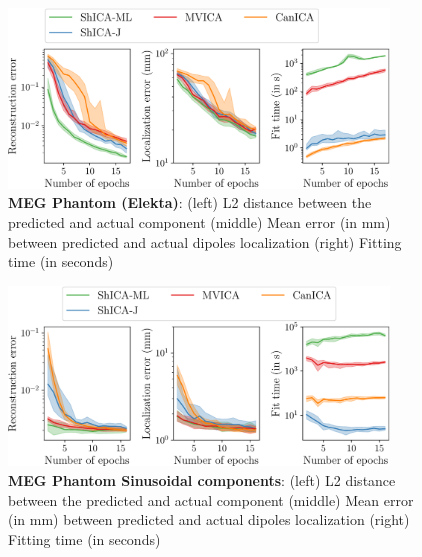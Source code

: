 \begin{figure}
\centering
  \includegraphics[width=0.9\textwidth]{./figures/amvica/meg_phantom.pdf}
  \caption{\textbf{MEG Phantom (Elekta)}: (left) L2 distance between the predicted and actual component (middle) Mean error (in mm) between predicted and actual dipoles localization (right) Fitting time (in seconds)}
\label{exp:meg_phantom}
\end{figure}

\begin{figure}
\centering
  \includegraphics[width=0.9\textwidth]{./figures/amvica/meg_phantom_neurips.pdf}
  \caption{\textbf{MEG Phantom Sinusoidal components}: (left) L2 distance between the predicted and actual component (middle) Mean error (in mm) between predicted and actual dipoles localization (right) Fitting time (in seconds)}
\label{exp:meg_phantom_neurips}
\end{figure}



